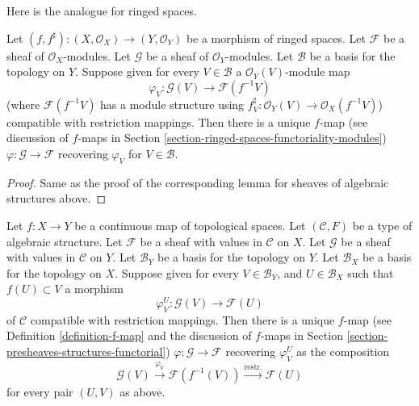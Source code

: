\noindent
Here is the analogue for ringed spaces.

\begin{lemma}
\label{lemma-f-map-basis-below-modules}
Let $(f, f^\sharp) : (X, \mathcal{O}_X) \to (Y, \mathcal{O}_Y)$
be a morphism of ringed spaces.
Let $\mathcal{F}$ be a sheaf of $\mathcal{O}_X$-modules.
Let $\mathcal{G}$ be a sheaf of $\mathcal{O}_Y$-modules.
Let $\mathcal{B}$ be a basis for the topology on $Y$.
Suppose given for every $V \in \mathcal{B}$ a
$\mathcal{O}_Y(V)$-module map
$$
\varphi_V :
\mathcal{G}(V)
\longrightarrow
\mathcal{F}(f^{-1}V)
$$
(where $\mathcal{F}(f^{-1}V)$ has a module structure using
$f^\sharp_V : \mathcal{O}_Y(V) \to \mathcal{O}_X(f^{-1}V)$)
compatible with restriction mappings.
Then there is a unique $f$-map (see discussion of $f$-maps in
Section \ref{section-ringed-spaces-functoriality-modules})
$\varphi : \mathcal{G} \to \mathcal{F}$
recovering $\varphi_V$ for $V \in \mathcal{B}$.
\end{lemma}

\begin{proof}
Same as the proof of the corresponding lemma
for sheaves of algebraic structures above.
\end{proof}

\begin{lemma}
\label{lemma-f-map-basis-above-and-below-structures}
Let $f : X \to Y$ be a continuous map of topological spaces.
Let $(\mathcal{C}, F)$ be a type of algebraic structure.
Let $\mathcal{F}$ be a sheaf with values in $\mathcal{C}$ on $X$.
Let $\mathcal{G}$ be a sheaf with values in $\mathcal{C}$ on $Y$.
Let $\mathcal{B}_Y$ be a basis for the topology on $Y$.
Let $\mathcal{B}_X$ be a basis for the topology on $X$.
Suppose given for every $V \in \mathcal{B}_Y$, and
$U \in \mathcal{B}_X$ such that $f(U) \subset V$ a morphism
$$
\varphi_V^U :
\mathcal{G}(V)
\longrightarrow
\mathcal{F}(U)
$$
of $\mathcal{C}$ compatible with restriction mappings.
Then there is a unique $f$-map (see
Definition \ref{definition-f-map} and the discussion
of $f$-maps in Section \ref{section-presheaves-structures-functorial})
$\varphi : \mathcal{G} \to \mathcal{F}$
recovering $\varphi_V^U$ as the composition
$$
\mathcal{G}(V) \xrightarrow{\varphi_V}
\mathcal{F}(f^{-1}(V)) \xrightarrow{\text{restr.}}
\mathcal{F}(U)
$$
for every pair $(U, V)$ as above.
\end{lemma}

